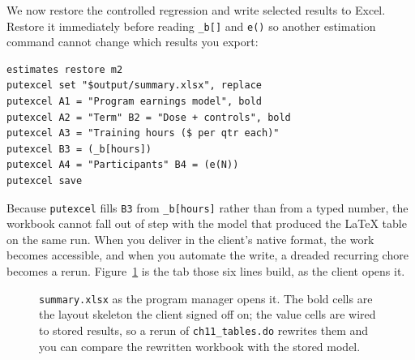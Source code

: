 We now restore the controlled regression and write selected results to Excel. Restore it immediately before reading \texttt{\_b[]} and \texttt{e()} so another estimation command cannot change which results you export:
\par
{\footnotesize
\begin{verbatim}
estimates restore m2
putexcel set "$output/summary.xlsx", replace
putexcel A1 = "Program earnings model", bold
putexcel A2 = "Term" B2 = "Dose + controls", bold
putexcel A3 = "Training hours ($ per qtr each)"
putexcel B3 = (_b[hours])
putexcel A4 = "Participants" B4 = (e(N))
putexcel save
\end{verbatim}
}
Because \texttt{putexcel} fills \texttt{B3} from \texttt{\_b[hours]} rather than from a typed number, the workbook cannot fall out of step with the model that produced the \LaTeX{} table on the same run. When you deliver in the client's native format, the work becomes accessible, and when you automate the write, a dreaded recurring chore becomes a rerun. Figure~\ref{fig:ch11-viz-workbook} is the tab those six lines build, as the client opens it.

\begin{figure}[htbp]
\centering
{}
\caption[The generated summary tab]{\texttt{summary.xlsx} as the program manager opens it. The bold cells are the layout skeleton the client signed off on; the value cells are wired to stored results, so a rerun of \texttt{ch11\_tables.do} rewrites them and you can compare the rewritten workbook with the stored model.}
\label{fig:ch11-viz-workbook}
\end{figure}

